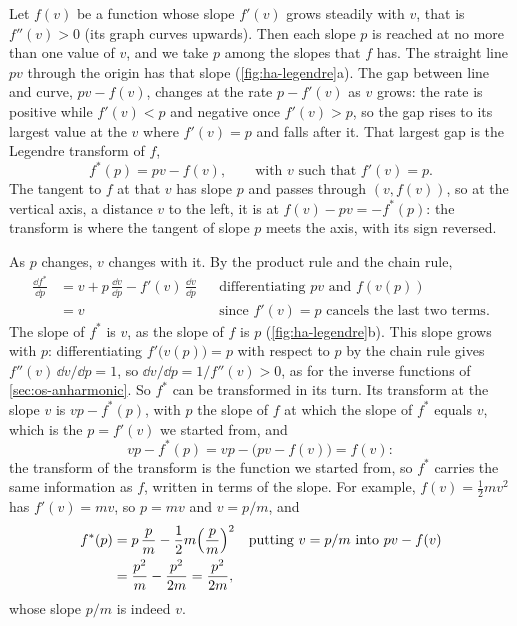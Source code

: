 \begin{toolbox}
Let $f(v)$ be a function whose slope $f'(v)$ grows steadily with $v$,
that is $f''(v) > 0$ (its graph curves upwards). Then each slope $p$ is
reached at no more than one value of $v$, and we take $p$ among the slopes
that $f$ has. The straight line $pv$ through the origin has that slope
(\cref{fig:ha-legendre}a). The gap between line and
curve, $pv - f(v)$, changes at the rate $p - f'(v)$ as $v$ grows: the
rate is positive while $f'(v) < p$ and negative once $f'(v) > p$, so the
gap rises to its largest value at the $v$ where $f'(v) = p$ and falls
after it. That largest gap is the Legendre transform of $f$,
\begin{equation*}
   f^*(p) = pv - f(v) , \qquad\text{with $v$ such that } f'(v) = p .
\end{equation*}
The tangent to $f$ at that $v$ has slope $p$ and passes through $(v,
f(v))$, so at the vertical axis, a distance $v$ to the left, it is at
$f(v) - pv = -f^*(p)$: the transform is where the tangent of slope $p$
meets the axis, with its sign reversed.

As $p$ changes, $v$ changes with it. By the product rule and the chain
rule,
\begin{align*}
   \frac{\dd f^*}{\dd p}
   &= v + p\,\frac{\dd v}{\dd p} - f'(v)\,\frac{\dd v}{\dd p}
   && \text{differentiating $pv$ and $f(v(p))$}\\
   &= v
   && \text{since $f'(v) = p$ cancels the last two terms.}
\end{align*}
The slope of $f^*$ is $v$, as the slope of $f$ is $p$
(\cref{fig:ha-legendre}b). This slope grows with $p$: differentiating $f'\bigl(v(p)\bigr) = p$ with
respect to $p$ by the chain rule gives $f''(v)\,\dd v/\dd p = 1$, so $\dd
v/\dd p = 1/f''(v) > 0$, as for the inverse functions of
\cref{sec:os-anharmonic}. So $f^*$ can be transformed in its turn. Its
transform at the slope $v$ is $vp - f^*(p)$, with $p$ the slope of $f$ at
which the slope of $f^*$ equals $v$, which is the $p = f'(v)$ we started
from, and
\begin{equation*}
   vp - f^*(p) = vp - \bigl(pv - f(v)\bigr) = f(v) :
\end{equation*}
the transform of the transform is the function we started from, so
$f^*$ carries the same information as $f$, written in terms of the slope.
For example, $f(v) = \frac12 mv^2$ has $f'(v) = mv$, so $p = mv$ and $v =
p/m$, and
\begin{align*}
   f^*(p) &= p\,\frac{p}{m} - \frac12 m\Bigl(\frac{p}{m}\Bigr)^2
   && \text{putting $v = p/m$ into $pv - f(v)$}\\
   &= \frac{p^2}{m} - \frac{p^2}{2m} = \frac{p^2}{2m} ,
\end{align*}
whose slope $p/m$ is indeed $v$.
\end{toolbox}

